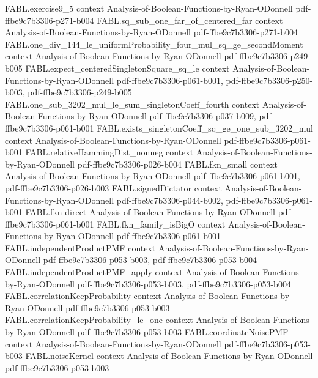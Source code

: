 \begin{theorem}
  {FABL.exercise9_5}
  {context}
  {Analysis-of-Boolean-Functions-by-Ryan-ODonnell}
  {pdf-ffbe9c7b3306-p271-b004}
\proofstep
  {FABL.sq_sub_one_far_of_centered_far}
  {context}
  {Analysis-of-Boolean-Functions-by-Ryan-ODonnell}
  {pdf-ffbe9c7b3306-p271-b004}
\proofstep
  {FABL.one_div_144_le_uniformProbability_four_mul_sq_ge_secondMoment}
  {context}
  {Analysis-of-Boolean-Functions-by-Ryan-ODonnell}
  {pdf-ffbe9c7b3306-p249-b005}
\proofstep
  {FABL.expect_centeredSingletonSquare_sq_le}
  {context}
  {Analysis-of-Boolean-Functions-by-Ryan-ODonnell}
  {pdf-ffbe9c7b3306-p061-b001,
    pdf-ffbe9c7b3306-p250-b003,
    pdf-ffbe9c7b3306-p249-b005}
\proofstep
  {FABL.one_sub_3202_mul_le_sum_singletonCoeff_fourth}
  {context}
  {Analysis-of-Boolean-Functions-by-Ryan-ODonnell}
  {pdf-ffbe9c7b3306-p037-b009,
    pdf-ffbe9c7b3306-p061-b001}
\proofstep
  {FABL.exists_singletonCoeff_sq_ge_one_sub_3202_mul}
  {context}
  {Analysis-of-Boolean-Functions-by-Ryan-ODonnell}
  {pdf-ffbe9c7b3306-p061-b001}
\proofstep
  {FABL.relativeHammingDist_nonneg}
  {context}
  {Analysis-of-Boolean-Functions-by-Ryan-ODonnell}
  {pdf-ffbe9c7b3306-p026-b004}
\proofstep
  {FABL.fkn_small}
  {context}
  {Analysis-of-Boolean-Functions-by-Ryan-ODonnell}
  {pdf-ffbe9c7b3306-p061-b001,
    pdf-ffbe9c7b3306-p026-b003}
\proofstep
  {FABL.signedDictator}
  {context}
  {Analysis-of-Boolean-Functions-by-Ryan-ODonnell}
  {pdf-ffbe9c7b3306-p044-b002,
    pdf-ffbe9c7b3306-p061-b001}
\proofstep
  {FABL.fkn}
  {direct}
  {Analysis-of-Boolean-Functions-by-Ryan-ODonnell}
  {pdf-ffbe9c7b3306-p061-b001}
\proofstep
  {FABL.fkn_family_isBigO}
  {context}
  {Analysis-of-Boolean-Functions-by-Ryan-ODonnell}
  {pdf-ffbe9c7b3306-p061-b001}
\proofstep
  {FABL.independentProductPMF}
  {context}
  {Analysis-of-Boolean-Functions-by-Ryan-ODonnell}
  {pdf-ffbe9c7b3306-p053-b003,
    pdf-ffbe9c7b3306-p053-b004}
\proofstep
  {FABL.independentProductPMF_apply}
  {context}
  {Analysis-of-Boolean-Functions-by-Ryan-ODonnell}
  {pdf-ffbe9c7b3306-p053-b003,
    pdf-ffbe9c7b3306-p053-b004}
\proofstep
  {FABL.correlationKeepProbability}
  {context}
  {Analysis-of-Boolean-Functions-by-Ryan-ODonnell}
  {pdf-ffbe9c7b3306-p053-b003}
\proofstep
  {FABL.correlationKeepProbability_le_one}
  {context}
  {Analysis-of-Boolean-Functions-by-Ryan-ODonnell}
  {pdf-ffbe9c7b3306-p053-b003}
\proofstep
  {FABL.coordinateNoisePMF}
  {context}
  {Analysis-of-Boolean-Functions-by-Ryan-ODonnell}
  {pdf-ffbe9c7b3306-p053-b003}
\proofstep
  {FABL.noiseKernel}
  {context}
  {Analysis-of-Boolean-Functions-by-Ryan-ODonnell}
  {pdf-ffbe9c7b3306-p053-b003}
\proofstep

\end{theorem}
